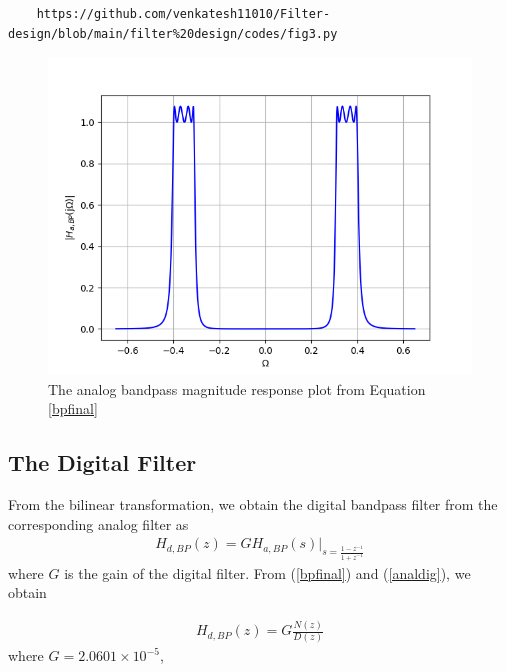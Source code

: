 \documentclass{article}
\begin{document}
\begin{lstlisting}
	https://github.com/venkatesh11010/Filter-design/blob/main/filter%20design/codes/fig3.py
\end{lstlisting}
\begin{figure}[H]
\includegraphics[width = \columnwidth]{figs/fig3.png}
\caption{The analog bandpass magnitude response plot from Equation \ref{bpfinal}} 
\label{fig4}
\end{figure}

\subsection{The Digital Filter}
From the bilinear transformation, we obtain the digital bandpass filter from the corresponding analog filter as
\begin{eqnarray}
\label{analdig}
H_{d,BP}(z) = GH_{a,BP}(s)\vert_{s = \frac{1-z^{-1}}{1 + z^{-1}}}
\end{eqnarray}
where $G$ is the gain of the digital filter.  From (\ref{bpfinal}) and (\ref{analdig}), we obtain

\begin{eqnarray}
H_{d,BP}(z) = G \frac{N(z)}{D(z)}
\end{eqnarray}
where $G = 2.0601 \times 10^{-5}$,
\end{document}
